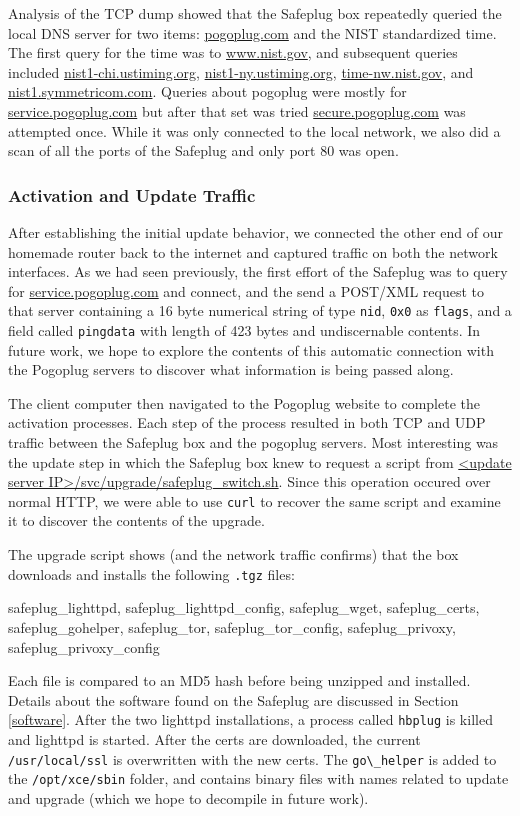 Analysis of the TCP dump showed that the Safeplug box repeatedly queried the local DNS server for two items: \url{pogoplug.com} and the NIST standardized time.  The first query for the time was to \url{www.nist.gov}, and subsequent queries included \url{nist1-chi.ustiming.org}, \url{nist1-ny.ustiming.org}, \url{time-nw.nist.gov}, and \url{nist1.symmetricom.com}.  Queries about pogoplug were mostly for \url{service.pogoplug.com} but after that set was tried \url{secure.pogoplug.com} was attempted once.  While it was only connected to the local network, we also did a scan of all the ports of the Safeplug and only port 80 was open.

\subsubsection{Activation and Update Traffic}
\label{updatetraf}
After establishing the initial update behavior, we connected the other end of our homemade router back to the internet and captured traffic on both the network interfaces. As we had seen previously, the first effort of the Safeplug was to query for \url{service.pogoplug.com} and connect, and the send a POST/XML request to that server containing a 16 byte numerical string of type \verb!nid!, \verb!0x0! as \verb!flags!, and a field called \verb!pingdata! with length of 423 bytes and undiscernable contents.  In future work, we hope to explore the contents of this automatic connection with the Pogoplug servers to discover what information is being passed along. 

The client computer then navigated to the Pogoplug website to complete the activation processes.  Each step of the process resulted in both TCP and UDP traffic between the Safeplug box and the pogoplug servers.  Most interesting was the update step in which the Safeplug box knew to request a script from \url{<update server IP>/svc/upgrade/safeplug\_switch.sh}.  Since this operation occured over normal HTTP, we were able to use \verb!curl! to recover the same script and examine it to discover the contents of the upgrade.

The upgrade script shows (and the network traffic confirms) that the box downloads and installs the following \verb!.tgz! files: 
\begin{fileName}
safeplug_lighttpd, safeplug_lighttpd_config, safeplug_wget, safeplug_certs, safeplug_gohelper, safeplug_tor, safeplug_tor_config, safeplug_privoxy, safeplug_privoxy_config
\end{fileName}
  Each file is compared to an MD5 hash before being unzipped and installed.  Details about the software found on the Safeplug are discussed in Section \ref{software}.  After the two lighttpd installations, a process called \verb!hbplug! is killed and lighttpd is started.  After the certs are downloaded, the current \verb!/usr/local/ssl! is overwritten with the new certs.  The \verb!go\_helper! is added to the \verb!/opt/xce/sbin! folder, and contains binary files with names related to update and upgrade (which we hope to decompile in future work).

